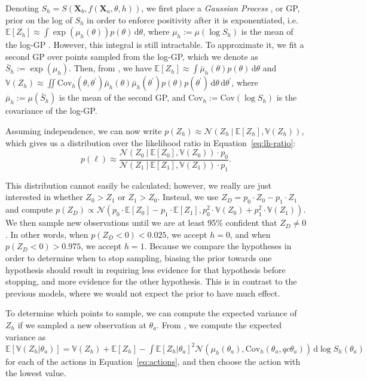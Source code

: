 \documentclass[10pt,letterpaper]{article}
\newcommand{\Xa}[0]{\mathbf{X}_a}
\newcommand{\Xb}[0]{\mathbf{X}_b}
\newcommand{\hi}[0]{h=0}
\newcommand{\hf}[0]{h=1}
\newcommand{\dif}[0]{\,\mathrm{d}}
\begin{document}
Denoting $S_h=S(\Xb, f(\Xa, \theta, h))$, we first place a
\textit{Gaussian Process} \cite{Rasmussen:2006vz}, or GP, prior on the
log of $S_h$ in order to enforce positivity after it is exponentiated,
i.e. $\mathbb{E}[Z_h] \approx \int
\exp(\mu_h(\theta))p(\theta)\dif\theta$, where $\mu_h:=\mu(\log S_h)$
is the mean of the log-GP \cite{Osborne:2012tm}.  However, this
integral is still intractable. To approximate it, we fit a second GP
over points sampled from the log-GP, which we denote as
$\bar{S}_h:=\exp(\mu_h)$. Then, from , we have
$\mathbb{E}[Z_h] \approx \int \bar{\mu}_h(\theta)p(\theta)\dif\theta$
and $\mathbb{V}(Z_h) \approx \iint \mathrm{Cov}_h(\theta,
\theta^\prime)\bar{\mu}_h(\theta)\bar{\mu}_h(\theta^\prime)p(\theta)p(\theta^\prime)\dif\theta\dif\theta^\prime$,
where $\bar{\mu}_h:=\mu(\bar{S}_h)$ is the mean of the second GP, and
$\mathrm{Cov}_h:=\mathrm{Cov}(\log S_h)$ is the covariance of the
log-GP.

Assuming independence, we can now write $p(Z_h)\approx\mathcal{N}(Z_h\
\vert\ \mathbb{E}[Z_h], \mathbb{V}(Z_h))$, which gives us a
distribution over the likelihood ratio in Equation~\ref{eq:lh-ratio}:
\begin{equation}
p(\ell)\approx\frac{\mathcal{N}(Z_0\ \vert\ \mathbb{E}[Z_0], \mathbb{V}(Z_0))\cdot{}p_0}{\mathcal{N}(Z_1\ \vert\ \mathbb{E}[Z_1], \mathbb{V}(Z_1))\cdot{}p_1}.
\end{equation}

This distribution cannot easily be calculated; however, we really are
just interested in whether $Z_0>Z_1$ or $Z_1>Z_0$. Instead, we use
$Z_D=p_0\cdot{}Z_0-p_1\cdot{}Z_1$ and compute
$p(Z_D)\propto\mathcal{N}(p_0\cdot{}\mathbb{E}[Z_0] -
p_1\cdot{}\mathbb{E}[Z_1], p_0^2\cdot{}\mathbb{V}(Z_0) +
p_1^2\cdot{}\mathbb{V}(Z_1))$.
We then sample new observations until we are at least 95\% confident
that $Z_D\neq 0$. In other words, when $p(Z_D<0)<0.025$, we accept
$\hi$, and when $p(Z_D<0)>0.975$, we accept $\hf$. Because we compare
the hypotheses in order to determine when to stop sampling, biasing
the prior towards one hypothesis should result in requiring less
evidence for that hypothesis before stopping, and more evidence for
the other hypothesis. This is in contrast to the previous models,
where we would not expect the prior to have much effect.

To determine which points to sample, we can compute the expected
variance of $Z_h$ if we sampled a new observation at $\theta_a$. From
\citeA{Osborne:2012tm}, we compute the expected variance as
$\mathbb{E}[\mathbb{V}(Z_h|\theta_a)]=\mathbb{V}(Z_h) +
\mathbb{E}[Z_h] - \int \mathbb{E}[Z_h|\theta_{a}]^2
\mathcal{N}(\mu_h(\theta_a), \mathrm{Cov}_h(\theta_a,
qc\theta_a))\dif\log S_h(\theta_a)$
for each of the actions in Equation~\ref{eq:actions}, and then choose
the action with the lowest value.
\end{document}
